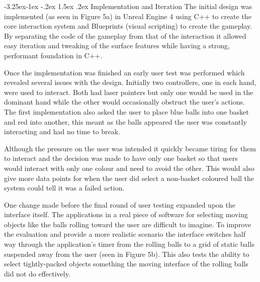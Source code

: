 \documentclass[12pt]{article}
\makeatletter
\renewcommand{\subsubsection}{\@startsection{subsubsection}{2}{\z@}%
             {-3.25ex\@plus -1ex \@minus -.2ex}%
             {1.5ex \@plus .2ex}%
             {\normalfont\normalsize\scshape\bfseries}}
\makeatother
\begin{document}
\subsubsection{Implementation and Iteration}
The initial design was implemented (as seen in Figure 5a) in Unreal Engine 4 using C++ to create the core interaction system and Blueprints (visual scripting) to create the gameplay. By separating the code of the gameplay from that of the interaction it allowed easy iteration and tweaking of the surface features while having a strong, performant foundation in C++. 

Once the implementation was finished an early user test was performed which revealed several issues with the design. Initially two controllers, one in each hand, were used to interact. Both had laser pointers but only one would be used in the dominant hand while the other would occasionally obstruct the user's actions. The first implementation also asked the user to place blue balls into one basket and red into another, this meant as the balls appeared the user was constantly interacting and had no time to break.

Although the pressure on the user was intended it quickly became tiring for them to interact and the decision was made to have only one basket so that users would interact with only one colour and need to avoid the other. This would also give more data points for when the user did select a non-basket coloured ball the system could tell it was a failed action.

One change made before the final round of user testing expanded upon the interface itself. The applications in a real piece of software for selecting moving objects like the balls rolling toward the user are difficult to imagine. To improve the evaluation and provide a more realistic scenario the interface switches half way through the application's timer from the rolling balls to a grid of static balls suspended away from the user (seen in Figure 5b). This also tests the ability to select tightly-packed objects something the moving interface of the rolling balls did not do effectively.
\end{document}
